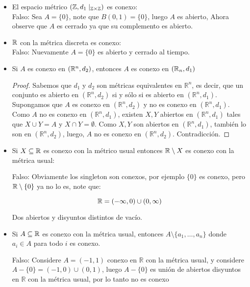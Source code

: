 \begin{itemize}[leftmargin=*]

\item El espacio métrico $(\mathbb{Z},d_1\mid_{\mathbb{Z}\times \mathbb{Z}})$ es conexo:\\

Falso: Sea $A=\{0\}$, note que $B(0,1)=\{0\}$, luego $A$ es abierto, Ahora observe que $A$ es cerrado ya que su complemento es abierto.

\item $\mathbb{R}$ con la métrica discreta es conexo:\\

Falso: Nuevamente $A=\{0\}$ es abierto y cerrado al tiempo.

\item Si $A$ es conexo en $(\mathbb{R}^n,d_2)$, entonces $A$ es conexo en $(\mathbb{R}_n,d_1)$\\


\begin{proof}
 Sabemos que $d_1$ y $d_2$ son métricas equivalentes en $\mathbb{R}^n$, es decir, que un conjunto es abierto en $(\mathbb{R}^n,d_2)$ si y sólo si es abierto en $(\mathbb{R}^n,d_1)$. Supongamos que $A$ es conexo en $(\mathbb{R}^n,d_2)$ y no es conexo en $(\mathbb{R}^n,d_1)$. Como $A$ no es conexo en $(\mathbb{R}^n,d_1)$, existen $X,Y$ abiertos en $(\mathbb{R}^n,d_1)$ tales que $X \cup Y=A$ y $X \cap Y=\emptyset$. Como $X,Y$ son abiertos en $(\mathbb{R}^n,d_1)$, también lo son en $(\mathbb{R}^n,d_2)$, luego, $A$ no es conexo en $(\mathbb{R}^n,d_2)$. Contradicción.
\end{proof}



\item Si $X\subseteq \mathbb{R}$ es conexo con la métrico usual entonces $\mathbb{R}\setminus X$ es conexo con la métrica usual:

Falso: Obviamente los singleton son conexos, por ejemplo $\{0\}$ es conexo, pero $\mathbb{R}\setminus\{0\}$ ya no lo es, note que:

$$\mathbb{R}=(-\infty,0)\cup (0,\infty)$$

Dos abiertos y disyuntos distintos de vacío.

\item Si $A\subseteq \mathbb{R}$ es conexo con la métrica usual, entonces $A\setminus \{a_1,\ldots,a_n\}$ donde $a_i\in A$ para todo $i$ es conexo.

Falso: Considere $A=(-1,1)$ conexo en $\mathbb{R}$ con la métrica usual, y considere $A-\{0\}=(-1,0)\cup (0,1)$, luego $A-\{0\}$ es unión de abiertos disyuntos en $\mathbb{R}$ con la métrica usual, por lo tanto no es conexo


\end{itemize}

